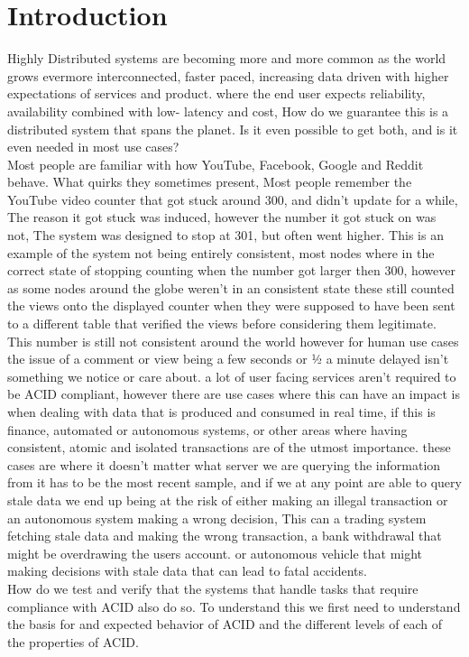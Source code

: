 \documentclass[a4paper,10pt,titlepage]{report}
\begin{document}
\chapter{Introduction}

Highly Distributed systems are becoming more and more common as the world grows evermore interconnected, faster paced, increasing data driven with higher expectations of services and product. where the end user expects reliability, availability combined with low- latency and cost, How do we guarantee this is a distributed system that spans the planet. Is it even possible to get both, and is it even needed in most use cases?\\
\vspace{5mm}
Most people are familiar with how YouTube, Facebook, Google and Reddit behave. What quirks they sometimes present, Most people remember the YouTube video counter that got stuck around 300, and didn't update for a while, The reason it got stuck was induced, however the number it got stuck on was not, The system was designed to stop at 301, but often went higher. This is an example of the system not being entirely consistent, most nodes where in the correct state of stopping counting when the number got larger then 300, however as some nodes around the globe weren't in an consistent state these still counted the views onto the displayed counter when they were supposed to have been sent to a different table that verified the views before considering them legitimate. This number is still not consistent around the world however for human use cases the issue of a comment or view being a few seconds or ½ a minute delayed isn't something we notice or care about. a lot of user facing services aren't required to be ACID compliant, however there are use cases where this can have an impact is when dealing with data that is produced and consumed in real time, if this is finance, automated or autonomous systems, or other areas where having consistent, atomic and isolated transactions are of the utmost importance. these cases are where it doesn't matter what server we are querying the information from it has to be the most recent sample, and if we at any point are able to query stale data we end up being at the risk of either making an illegal transaction or an autonomous system making a wrong decision, This can a trading system fetching stale data and making the wrong transaction, a bank withdrawal that might be overdrawing the users account. or autonomous vehicle that might making decisions with stale data that can lead to fatal accidents. \\
\vspace{5mm}
How do we test and verify that the systems that handle tasks that require compliance with ACID also do so. To understand this we first need to understand the basis for and expected behavior of ACID and the different levels of each of the properties of ACID.
\end{document}
